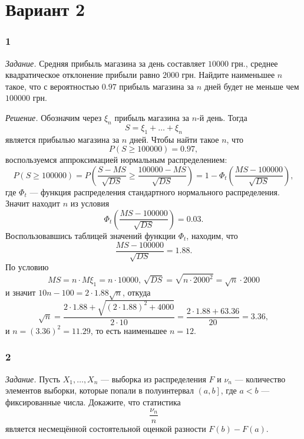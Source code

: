 \section*{Вариант 2}

\subsubsection*{1}

\textit{Задание.}
Средняя прибыль магазина за день составляет $10000$ грн.,
среднее квадратическое отклонение прибыли равно $2000$ грн.
Найдите наименьшее $n$ такое,
что с вероятностью $0.97$ прибыль магазина за $n$ дней будет не меньше чем $100000$ грн.

\textit{Решение.} Обозначим через $ \xi_n$ прибыль магазина за $n$-й день.
Тогда
$$S =
  \xi_1 + \dotsc + \xi_n$$
является прибылью магазина за $n$ дней.
Чтобы найти такое $n$, что
$$P \left( S \geq 100000 \right) =
  0.97,$$
воспользуемся аппроксимацией нормальным распределением:
$$P \left( S \geq 100000 \right) =
  P \left( \frac{S - MS}{ \sqrt{DS}} \geq \frac{100000 - MS}{ \sqrt{DS}} \right) =
  1 - \Phi_t \left( \frac{MS - 100000}{ \sqrt{DS}} \right),$$
где $ \Phi_t$ --- функция распределения стандартного нормального распределения.
Значит находит $n$ из условия
$$ \Phi_t \left( \frac{MS - 100000}{ \sqrt{DS}} \right) =
  0.03.$$
Воспользовавшись таблицей значений функции $ \Phi_t$, находим, что
$$ \frac{MS - 100000}{ \sqrt{DS}} =
  1.88.$$
По условию
$$MS = n \cdot M \xi_1 = n \cdot 10000, \,
  \sqrt{DS} = \sqrt{n \cdot 2000^2} = \sqrt{n} \cdot 2000$$
и значит $10n - 100 = 2 \cdot 1.88 \sqrt{n}$, откуда
$$ \sqrt{n} =
  \frac{2 \cdot 1.88 + \sqrt{ \left( 2 \cdot 1.88 \right)^2 + 4000}}{2 \cdot 10} =
  \frac{2 \cdot 1.88 + 63.36}{20} =
  3.36,$$
и $n = \left( 3.36 \right)^2 = 11.29$, то есть наименьшее $n = 12$.

\subsubsection*{2}

\textit{Задание.}
Пусть $X_1, \dotsc, X_n$ --- выборка из распределения $F$ и $ \nu_n$ ---
количество элементов выборки, которые попали в полуинтервал $ \left( a, b \right] $, где $a < b$ ---
фиксированные числа.
Докажите, что статистика
$$ \frac{ \nu_n}{n}$$
является несмещённой состоятельной оценкой разности $F \left( b \right) - F \left( a \right) $.

